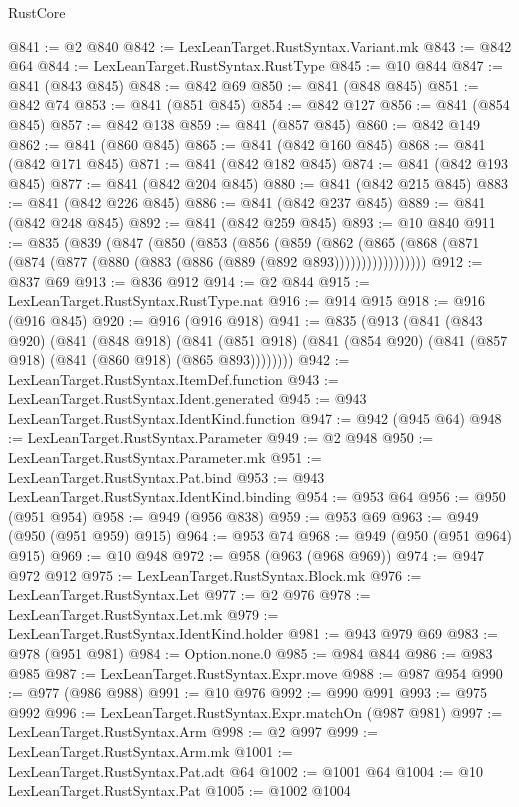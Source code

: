\begin{lexlean}{RustCore}
\begin{coremodule}
@841 := @2 @840
@842 := LexLeanTarget.RustSyntax.Variant.mk
@843 := @842 @64
@844 := LexLeanTarget.RustSyntax.RustType
@845 := @10 @844
@847 := @841 (@843 @845)
@848 := @842 @69
@850 := @841 (@848 @845)
@851 := @842 @74
@853 := @841 (@851 @845)
@854 := @842 @127
@856 := @841 (@854 @845)
@857 := @842 @138
@859 := @841 (@857 @845)
@860 := @842 @149
@862 := @841 (@860 @845)
@865 := @841 (@842 @160 @845)
@868 := @841 (@842 @171 @845)
@871 := @841 (@842 @182 @845)
@874 := @841 (@842 @193 @845)
@877 := @841 (@842 @204 @845)
@880 := @841 (@842 @215 @845)
@883 := @841 (@842 @226 @845)
@886 := @841 (@842 @237 @845)
@889 := @841 (@842 @248 @845)
@892 := @841 (@842 @259 @845)
@893 := @10 @840
@911 := @835
    (@839
      (@847
        (@850
          (@853
            (@856
              (@859
                (@862
                  (@865 (@868 (@871 (@874 (@877 (@880 (@883 (@886 (@889 (@892 @893)))))))))))))))))
@912 := @837 @69
@913 := @836 @912
@914 := @2 @844
@915 := LexLeanTarget.RustSyntax.RustType.nat
@916 := @914 @915
@918 := @916 (@916 @845)
@920 := @916 (@916 @918)
@941 := @835
    (@913
      (@841
        (@843 @920)
        (@841
          (@848 @918)
          (@841 (@851 @918) (@841 (@854 @920) (@841 (@857 @918) (@841 (@860 @918) (@865 @893))))))))
@942 := LexLeanTarget.RustSyntax.ItemDef.function
@943 := LexLeanTarget.RustSyntax.Ident.generated
@945 := @943 LexLeanTarget.RustSyntax.IdentKind.function
@947 := @942 (@945 @64)
@948 := LexLeanTarget.RustSyntax.Parameter
@949 := @2 @948
@950 := LexLeanTarget.RustSyntax.Parameter.mk
@951 := LexLeanTarget.RustSyntax.Pat.bind
@953 := @943 LexLeanTarget.RustSyntax.IdentKind.binding
@954 := @953 @64
@956 := @950 (@951 @954)
@958 := @949 (@956 @838)
@959 := @953 @69
@963 := @949 (@950 (@951 @959) @915)
@964 := @953 @74
@968 := @949 (@950 (@951 @964) @915)
@969 := @10 @948
@972 := @958 (@963 (@968 @969))
@974 := @947 @972 @912
@975 := LexLeanTarget.RustSyntax.Block.mk
@976 := LexLeanTarget.RustSyntax.Let
@977 := @2 @976
@978 := LexLeanTarget.RustSyntax.Let.mk
@979 := LexLeanTarget.RustSyntax.IdentKind.holder
@981 := @943 @979 @69
@983 := @978 (@951 @981)
@984 := Option.none.{0}
@985 := @984 @844
@986 := @983 @985
@987 := LexLeanTarget.RustSyntax.Expr.move
@988 := @987 @954
@990 := @977 (@986 @988)
@991 := @10 @976
@992 := @990 @991
@993 := @975 @992
@996 := LexLeanTarget.RustSyntax.Expr.matchOn (@987 @981)
@997 := LexLeanTarget.RustSyntax.Arm
@998 := @2 @997
@999 := LexLeanTarget.RustSyntax.Arm.mk
@1001 := LexLeanTarget.RustSyntax.Pat.adt @64
@1002 := @1001 @64
@1004 := @10 LexLeanTarget.RustSyntax.Pat
@1005 := @1002 @1004

\end{coremodule}
\end{lexlean}
